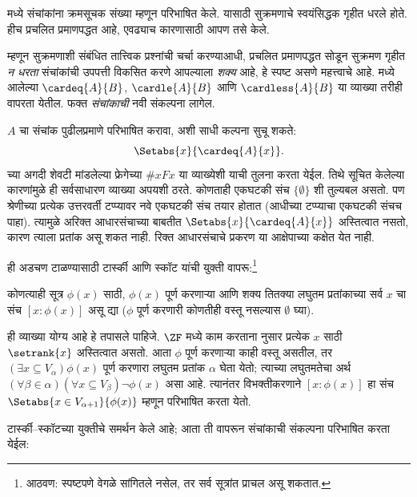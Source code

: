 \documentclass[../../../include/open-logic-section]{subfiles}
\begin{document}

 मध्ये संचांकांना क्रमसूचक संख्या म्हणून परिभाषित केले. यासाठी सुक्रमणाचे स्वयंसिद्धक गृहीत धरले होते. हीच प्रचलित प्रमाणपद्धत आहे, एवढ्याच कारणासाठी आपण तसे केले.

म्हणून सुक्रमणाशी संबंधित तात्त्विक प्रश्नांची चर्चा करण्याआधी, प्रचलित प्रमाणपद्धत सोडून सुक्रमण गृहीत \emph{न धरता} संचांकांची उपपत्ती विकसित करणे आपल्याला \emph{शक्य} आहे, हे स्पष्ट असणे महत्त्वाचे आहे.  मध्ये आलेल्या $\cardeq{A}{B}$, $\cardle{A}{B}$ आणि $\cardless{A}{B}$ या व्याख्या तरीही वापरता येतील. फक्त \emph{संचांकाची} नवी संकल्पना लागेल.

$A$ चा संचांक पुढीलप्रमाणे परिभाषित करावा, अशी साधी कल्पना सुचू शकते:
\[
	\Setabs{x}{\cardeq{A}{x}}.
\]
 च्या अगदी शेवटी मांडलेल्या फ्रेगेच्या $\# x Fx$ या व्याख्येशी याची तुलना करता येईल. तिथे सूचित केलेल्या कारणांमुळे ही सर्वसाधारण व्याख्या अपयशी ठरते. कोणताही एकघटकी संच $\{\emptyset\}$ शी तुल्यबल असतो. पण श्रेणीच्या प्रत्येक उत्तरवर्ती टप्प्यावर नवे एकघटकी संच तयार होतात (आधीच्या टप्प्याचा एकघटकी संचच पाहा). त्यामुळे अरिक्त आधारसंचाच्या बाबतीत $\Setabs{x}{\cardeq{A}{x}}$ अस्तित्वात नसतो, कारण त्याला प्रतांक असू शकत नाही. रिक्त आधारसंचाचे प्रकरण या आक्षेपाच्या कक्षेत येत नाही.

ही अडचण टाळण्यासाठी टार्स्की आणि स्कॉट यांची युक्ती वापरू:\footnote{आठवण: स्पष्टपणे वेगळे सांगितले नसेल, तर सर्व सूत्रांत प्राचल असू शकतात.}

\begin{defn}[टार्स्की--स्कॉट]
कोणत्याही सूत्र $\phi(x)$ साठी, $\phi(x)$ पूर्ण करणाऱ्या आणि शक्य तितक्या लघुतम प्रतांकाच्या सर्व $x$ चा संच $[ x : \phi(x)] $ असू द्या ($\phi$ पूर्ण करणारी कोणतीही वस्तू नसल्यास $\emptyset$ घ्या).
\end{defn}

ही व्याख्या योग्य आहे हे तपासले पाहिजे. $\ZF$ मध्ये काम करताना  नुसार प्रत्येक $x$ साठी $\setrank{x}$ अस्तित्वात असतो. आता $\phi$ पूर्ण करणाऱ्या काही वस्तू असतील, तर $(\exists x\subseteq V_\alpha)\phi(x)$ पूर्ण करणारा लघुतम प्रतांक $\alpha$ घेता येतो; त्याच्या लघुतमतेचा अर्थ $(\forall \beta
\in \alpha)(\forall x \subseteq V_\beta)\lnot \phi(x)$ असा आहे. त्यानंतर विभक्तीकरणाने $[x : \phi(x)]$ हा संच $\Setabs{x \in
V_{\alpha+1}}{\phi(x)}$ म्हणून परिभाषित करता येतो.

टार्स्की--स्कॉटच्या युक्तीचे समर्थन केले आहे; आता ती वापरून संचांकाची संकल्पना परिभाषित करता येईल:
\end{document}
